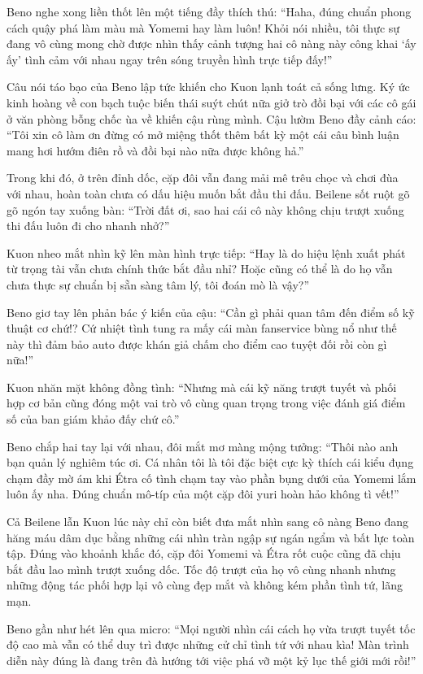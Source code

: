 \documentclass[../main.tex]{subfiles}
\begin{document}
Beno nghe xong liền thốt lên một tiếng đầy thích thú: ``Haha, đúng chuẩn phong cách quậy phá làm màu mà Yomemi hay làm luôn! Khỏi nói nhiều, tôi thực sự đang vô cùng mong chờ được nhìn thấy cảnh tượng hai cô nàng này công khai `ấy ấy' tình cảm với nhau ngay trên sóng truyền hình trực tiếp đấy!''

Câu nói táo bạo của Beno lập tức khiến cho Kuon lạnh toát cả sống lưng. Ký ức kinh hoàng về con bạch tuộc biến thái suýt chút nữa giở trò đồi bại với các cô gái ở văn phòng bỗng chốc ùa về khiến cậu rùng mình. Cậu lườm Beno đầy cảnh cáo: ``Tôi xin cô làm ơn đừng có mở miệng thốt thêm bất kỳ một cái câu bình luận mang hơi hướm điên rồ và đồi bại nào nữa được không hả.''

Trong khi đó, ở trên đỉnh dốc, cặp đôi vẫn đang mải mê trêu chọc và chơi đùa với nhau, hoàn toàn chưa có dấu hiệu muốn bắt đầu thi đấu. Beilene sốt ruột gõ gõ ngón tay xuống bàn: ``Trời đất ơi, sao hai cái cô này không chịu trượt xuống thi đấu luôn đi cho nhanh nhở?''

Kuon nheo mắt nhìn kỹ lên màn hình trực tiếp: ``Hay là do hiệu lệnh xuất phát từ trọng tài vẫn chưa chính thức bắt đầu nhỉ? Hoặc cũng có thể là do họ vẫn chưa thực sự chuẩn bị sẵn sàng tâm lý, tôi đoán mò là vậy?''

Beno giơ tay lên phản bác ý kiến của cậu: ``Cần gì phải quan tâm đến điểm số kỹ thuật cơ chứ!? Cứ nhiệt tình tung ra mấy cái màn fanservice bùng nổ như thế này thì đảm bảo auto được khán giả chấm cho điểm cao tuyệt đối rồi còn gì nữa!''

Kuon nhăn mặt không đồng tình: ``Nhưng mà cái kỹ năng trượt tuyết và phối hợp cơ bản cũng đóng một vai trò vô cùng quan trọng trong việc đánh giá điểm số của ban giám khảo đấy chứ cô.''

Beno chắp hai tay lại với nhau, đôi mắt mơ màng mộng tưởng: ``Thôi nào anh bạn quản lý nghiêm túc ơi. Cá nhân tôi là tôi đặc biệt cực kỳ thích cái kiểu đụng chạm đầy mờ ám khi Étra cố tình chạm tay vào phần bụng dưới của Yomemi lắm luôn ấy nha. Đúng chuẩn mô-típ của một cặp đôi yuri hoàn hảo không tì vết!''

Cả Beilene lẫn Kuon lúc này chỉ còn biết đưa mắt nhìn sang cô nàng Beno đang hăng máu dâm dục bằng những cái nhìn tràn ngập sự ngán ngẩm và bất lực toàn tập. Đúng vào khoảnh khắc đó, cặp đôi Yomemi và Étra rốt cuộc cũng đã chịu bắt đầu lao mình trượt xuống dốc. Tốc độ trượt của họ vô cùng nhanh nhưng những động tác phối hợp lại vô cùng đẹp mắt và không kém phần tình tứ, lãng mạn.

Beno gần như hét lên qua micro: ``Mọi người nhìn cái cách họ vừa trượt tuyết tốc độ cao mà vẫn có thể duy trì được những cử chỉ tình tứ với nhau kìa! Màn trình diễn này đúng là đang trên đà hướng tới việc phá vỡ một kỷ lục thế giới mới rồi!''
\end{document}
